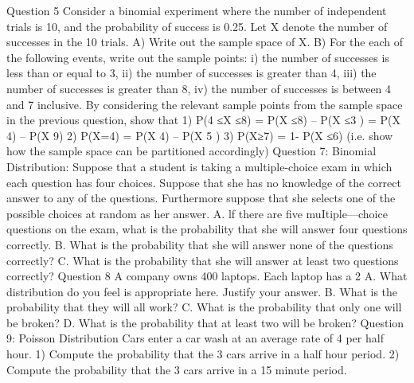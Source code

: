 Question 5
Consider a binomial experiment where the number of independent trials is 10, and the probability of success is 0.25. Let X denote the number of successes in the 10 trials.
A)	Write out the sample space of X.
B)	For the each of the following events, write out the sample points:
i)	the number of successes is less than or equal to 3,
ii)	the number of successes is greater than 4, 
iii)	the number of successes is greater than 8, 
iv)	the number of successes is between 4 and 7 inclusive.
By considering the relevant sample points from the sample space in the previous question, show that 
1)	P(4 ≤X ≤8) = P(X ≤8) – P(X ≤3 ) = P(X  4) – P(X  9)
2)	P(X=4) = P(X  4) – P(X  5 )
3)	P(X≥7) = 1- P(X ≤6)
(i.e. show how the sample space can be partitioned accordingly)
Question 7: Binomial Distribution: 
Suppose that a student is taking a multiple-choice exam in which each question has four choices.
Suppose that she has no knowledge of the correct answer to any of the questions. Furthermore suppose that she selects one of the possible choices at random as her answer.
A.	lf there are five muItiple—choice questions on the exam, what is the probability that she will answer four questions correctly.
B.	What is the probability that she will answer none of the questions correctly?
C.	What is the probability that she will answer at least two questions correctly?
Question 8
A company owns 400 laptops. Each laptop has a 2%
A. What distribution do you feel is appropriate here. Justify your answer. 
B. What is the probability that they will all work?
C. What is the probability that only one will be broken?
D. What is the probability that at least two will be broken? 
Question 9:  Poisson Distribution
Cars enter a car wash at an average rate of 4 per half hour. 
1)	Compute the probability that the 3 cars arrive in a half hour period.
2)	Compute the probability that the 3 cars arrive in a 15 minute period.

